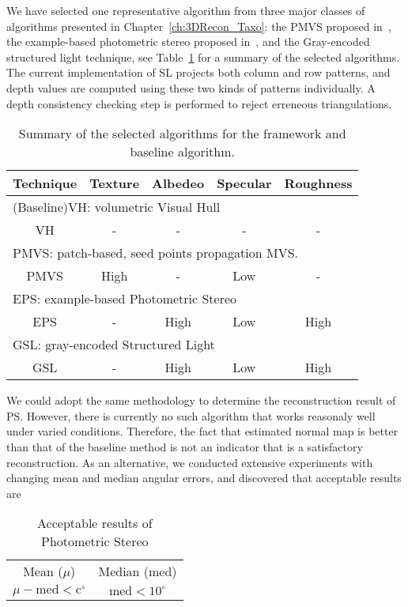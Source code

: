 We have selected one representative algorithm from three major classes of algorithms presented in Chapter~\ref{ch:3DRecon_Taxo}: the PMVS proposed in~\cite{furukawa2010accurate}, the example-based photometric stereo proposed in~\cite{hertzmann2005example}, and the Gray-encoded structured light technique, see Table~\ref{tab:selected_algo} for a summary of the selected algorithms. The current implementation of SL projects both column and row patterns, and depth values are computed using these two kinds of patterns individually. A depth consistency checking step is performed to reject erreneous triangulations.
\begin{table}[!htbp]
\centering
\begin{tabular}{c|c|c|c|c}
\hline
Technique & Texture & Albedeo & Specular & Roughness\\
\hline\hline
\multicolumn{5}{l}{(Baseline)VH: volumetric Visual Hull}\\
\hline
VH & - & - & - & -\\
\hline\hline
\multicolumn{5}{l}{PMVS: patch-based, seed points propagation MVS.}\\
\hline
PMVS & High & - & Low & -\\
\hline\hline
\multicolumn{5}{l}{EPS: example-based Photometric Stereo}\\
\hline
EPS & - & High & Low & High \\
\hline\hline
\multicolumn{5}{l}{GSL: gray-encoded Structured Light}\\
\hline
GSL & - & High & Low & High\\
\hline
\end{tabular}
\caption{Summary of the selected algorithms for the framework and baseline algorithm.}
\label{tab:selected_algo}
\end{table}

We could adopt the same methodology to determine the reconstruction result of PS. However, there is currently no such algorithm that works reasonaly well under varied conditions. Therefore, the fact that estimated normal map is better than that of the baseline method is not an indicator that is a satisfactory reconstruction. As an alternative, we conducted extensive experiments with changing mean and median angular errors, and discovered that acceptable results are
\begin{table}[!htbp]
\centering
\begin{tabular}{cc}
\hline
Mean ($\mu$) & Median (med)\\
$\mu - \text{med} < \text{c}^\circ$ & $\text{med}<10^\circ$\\
\hline
\end{tabular}
\caption{Acceptable results of Photometric Stereo}
\label{tab:ps_criteria}
\end{table}

